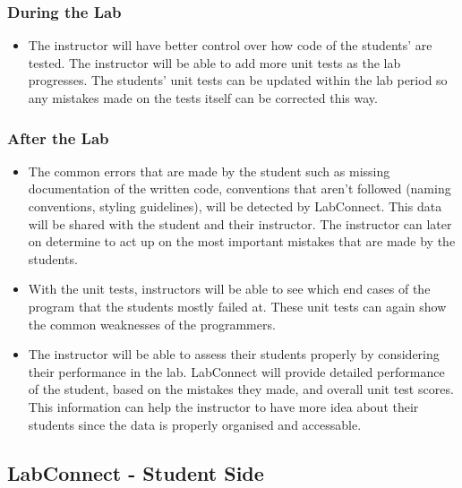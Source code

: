 \documentclass[a4paper, 12pt]{article}
\begin{document}
    \subsubsection{During the Lab}
    
    \begin{itemize}
        \item The instructor will have better control over how code of the students' are tested.
        The instructor will be able to add more unit tests as the lab progresses. 
        The students' unit tests can be updated within the lab period so any mistakes made
        on the tests itself can be corrected this way.
    \end{itemize}
    
    \subsubsection{After the Lab}
    
    \begin{itemize}
        \item The common errors that are made by the student such as missing documentation 
        of the written code, conventions that aren't followed (naming conventions, styling 
        guidelines), will be detected by LabConnect. This data will be shared with the student
        and their instructor. The instructor can later on determine to act up on the most
        important mistakes that are made by the students.
        \item With the unit tests, instructors will be able to see which end cases of the program
        that the students mostly failed at. These unit tests can again show the common weaknesses
        of the programmers.
        \item The instructor will be able to assess their students properly by considering their
        performance in the lab. LabConnect will provide detailed performance of the student, 
        based on the mistakes they made, and overall unit test scores. This information can help
        the instructor to have more idea about their students since the data is properly organised
        and accessable.
    \end{itemize}
    
    \subsection{LabConnect - Student Side}
    
\end{document}
